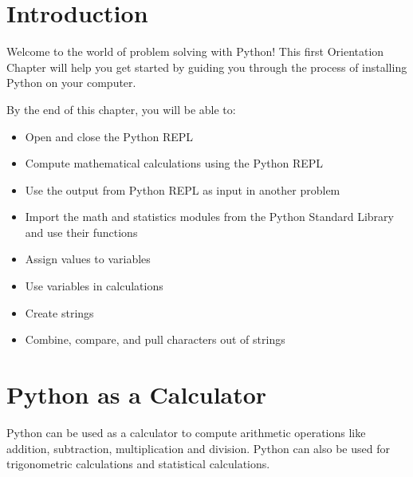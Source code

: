 \documentclass{book}
\begin{document}
    
        \hypertarget{introduction}{%
\section{Introduction}\label{introduction}}
    




    
        Welcome to the world of problem solving with Python! This first
Orientation Chapter will help you get started by guiding you through the
process of installing Python on your computer.
    




    
        By the end of this chapter, you will be able to:

\begin{itemize}
\item
  Open and close the Python REPL
\item
  Compute mathematical calculations using the Python REPL
\item
  Use the output from Python REPL as input in another problem
\item
  Import the math and statistics modules from the Python Standard
  Library and use their functions
\item
  Assign values to variables
\item
  Use variables in calculations
\item
  Create strings
\item
  Combine, compare, and pull characters out of strings
\end{itemize}
        \newpage

    




    
        \hypertarget{python-as-a-calculator}{%
\section{Python as a Calculator}\label{python-as-a-calculator}}
    




    
        Python can be used as a calculator to compute arithmetic operations like
addition, subtraction, multiplication and division. Python can also be
used for trigonometric calculations and statistical calculations.
    
\end{document}

